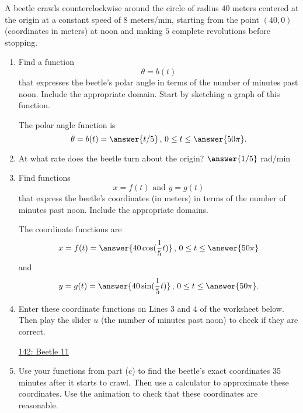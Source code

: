 \documentclass{ximera}
\begin{document}
\begin{example} \label{Edfhg]hghgdfg}
A beetle crawls counterclockwise around the circle of radius $40$ meters centered at the origin at a constant speed of $8$ meters/min, starting from the point $(40,0)$ (coordinates in meters) at noon and making $5$ complete revolutions before stopping.

\begin{enumerate}

\item Find a function
\[
    \theta = b(t)
\]
that expresses the beetle's polar angle in terms of the number of minutes past noon. Include the appropriate domain. Start by sketching a graph of this function.

The polar angle function is
\[
   \theta = b(t) = \answer{t/5} \, , \, 0 \leq t \leq \answer{50\pi} .
\]

\item At what rate does the beetle turn about the origin?  $\answer{1/5}$ rad/min



\item Find functions
\[
   x = f(t) \text{ and } y=g(t)
\]
that express the beetle's coordinates (in meters)  in terms of the number of minutes past noon. Include the appropriate domains.

The coordinate functions are
\[
    x = f(t) = \answer{40\cos(\frac{1}{5}t)} \, , \, 0 \leq t \leq \answer{50\pi} 
\]
and 
\[
    y = g(t) = \answer{40\sin(\frac{1}{5}t)} \, , \, 0 \leq t \leq \answer{50\pi} .
\]

\item Enter these coordinate functions on Lines 3 and 4 of the worksheet below. Then play the slider $u$ (the number of minutes past noon) to check if they are correct.

\begin{onlineOnly}
    \begin{center}
\end{center}
\end{onlineOnly}

\href{https://www.desmos.com/calculator/7uewzebyjt}{142: Beetle 11}

\item Use your functions from part (c) to find the beetle's exact coordinates 35 minutes after it starts to crawl. Then use a calculator to approximate these coordinates. Use the animation to check that these coordinates are reasonable.

\end{enumerate}
\end{example}
\end{document}
